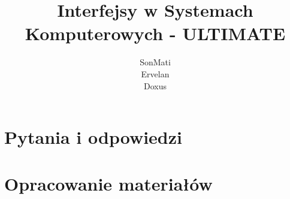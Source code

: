 \documentclass[a4paper,twoside]{article}
\begin{document}




\begin{titlepage}
\title{\huge Interfejsy w Systemach Komputerowych - ULTIMATE}
\author{\large SonMati \\ Ervelan \\ Doxus}
\maketitle
\end{titlepage}

\part{Pytania i odpowiedzi}
	

\part{Opracowanie materiałów}




	





\end{document}
